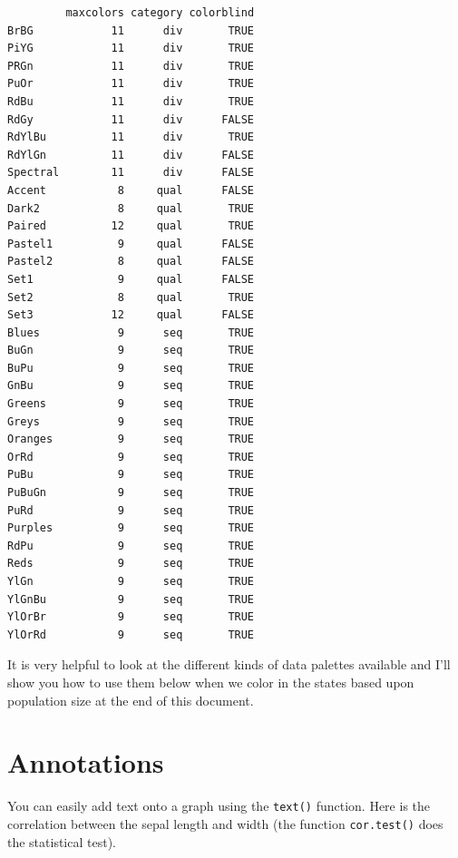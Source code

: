 \documentclass[
  letterpaper,
]{book}
\newenvironment{Shaded}{\begin{snugshade}}{\end{snugshade}}
\newcommand{\FunctionTok}[1]{\textcolor[rgb]{0.28,0.35,0.67}{#1}}
\newcommand{\NormalTok}[1]{\textcolor[rgb]{0.00,0.23,0.31}{#1}}
\newcommand{\OtherTok}[1]{\textcolor[rgb]{0.00,0.23,0.31}{#1}}
\newcommand{\SpecialCharTok}[1]{\textcolor[rgb]{0.37,0.37,0.37}{#1}}
\begin{document}
\begin{verbatim}
         maxcolors category colorblind
BrBG            11      div       TRUE
PiYG            11      div       TRUE
PRGn            11      div       TRUE
PuOr            11      div       TRUE
RdBu            11      div       TRUE
RdGy            11      div      FALSE
RdYlBu          11      div       TRUE
RdYlGn          11      div      FALSE
Spectral        11      div      FALSE
Accent           8     qual      FALSE
Dark2            8     qual       TRUE
Paired          12     qual       TRUE
Pastel1          9     qual      FALSE
Pastel2          8     qual      FALSE
Set1             9     qual      FALSE
Set2             8     qual       TRUE
Set3            12     qual      FALSE
Blues            9      seq       TRUE
BuGn             9      seq       TRUE
BuPu             9      seq       TRUE
GnBu             9      seq       TRUE
Greens           9      seq       TRUE
Greys            9      seq       TRUE
Oranges          9      seq       TRUE
OrRd             9      seq       TRUE
PuBu             9      seq       TRUE
PuBuGn           9      seq       TRUE
PuRd             9      seq       TRUE
Purples          9      seq       TRUE
RdPu             9      seq       TRUE
Reds             9      seq       TRUE
YlGn             9      seq       TRUE
YlGnBu           9      seq       TRUE
YlOrBr           9      seq       TRUE
YlOrRd           9      seq       TRUE
\end{verbatim}

It is very helpful to look at the different kinds of data palettes
available and I'll show you how to use them below when we color in the
states based upon population size at the end of this document.

\section{Annotations}\label{annotations}

You can easily add text onto a graph using the \texttt{text()} function.
Here is the correlation between the sepal length and width (the function
\texttt{cor.test()} does the statistical test).

\begin{Shaded}
\end{Shaded}
\end{document}
